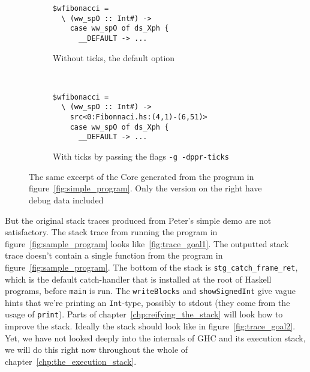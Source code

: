 \begin{figure}
\begin{mdframed}
        \begin{subfigure}[t]{0.4\textwidth}
            \begin{verbatim}
$wfibonacci =
  \ (ww_spO :: Int#) ->
    case ww_spO of ds_Xph {
      __DEFAULT -> ...
            \end{verbatim}
            \caption{Without ticks, the default option}
        \end{subfigure}
        ~ %
        \begin{subfigure}[t]{0.6\textwidth}
          \begin{verbatim}
$wfibonacci =
  \ (ww_spO :: Int#) ->
    src<0:Fibonnaci.hs:(4,1)-(6,51)>
    case ww_spO of ds_Xph {
      __DEFAULT -> ...
          \end{verbatim}
          \caption{With ticks by passing the flags \texttt{-g -dppr-ticks}}
        \end{subfigure}
        \caption{The same excerpt of the Core generated from the program
in figure~\ref{fig:simple_program}. Only the version on the right have
debug data included }\label{fig:core_and_ticks}
\end{mdframed}
\end{figure}

But the original stack traces produced from Peter's simple demo
are not satisfactory. The stack trace from running the program in
figure~\ref{fig:sample_program} looks like~\ref{fig:trace_goal1}.
The outputted stack trace doesn't contain a single function from the
program in figure~\ref{fig:sample_program}. The bottom of the stack is
\texttt{stg\_catch\_frame\_ret}, which is the default catch-handler that
is installed at the root of Haskell programs, before \texttt{main} is
run. The \texttt{writeBlocks} and \texttt{showSignedInt} give vague
hints that we're printing an \texttt{Int}-type, possibly to stdout
(they come from the usage of \texttt{print}). Parts of chapter~\ref{chp:reifying_the_stack} will look how to improve the stack. Ideally
the stack should look like in figure~\ref{fig:trace_goal2}. Yet, we
have not looked deeply into the internals of GHC and its execution
stack, we will do this right now throughout the whole of chapter~\ref{chp:the_execution_stack}.

